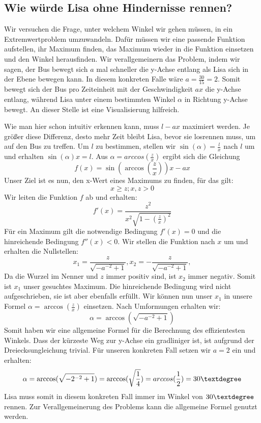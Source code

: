 \documentclass[a4paper,10pt,ngerman]{scrartcl}
\begin{document}
\subsection{Wie würde Lisa ohne Hindernisse rennen?}
Wir versuchen die Frage, unter welchem Winkel wir gehen müssen, in ein Extremwertproblem umzuwandeln. Dafür müssen wir eine passende Funktion aufstellen, ihr Maximum finden, das Maximum wieder in die Funktion einsetzen und den Winkel herausfinden. Wir verallgemeinern das Problem, indem wir sagen, der Bus bewegt sich $a$ mal schneller die y-Achse entlang als Lisa sich in der Ebene bewegen kann. In diesem konkreten Falle wäre $a=\frac{30}{15}=2$. Somit bewegt sich der Bus pro Zeiteinheit mit der Geschwindigkeit $ax$ die y-Achse entlang, während Lisa unter einem bestimmten Winkel $\alpha$ in Richtung y-Achse bewegt. An dieser Stelle ist eine Visualisierung hilfreich.
\begin{center}
\end{center}

Wie man hier schon intuitiv erkennen kann, muss $l-ax$ maximiert werden. Je größer diese Differenz, desto mehr Zeit bleibt Lisa, bevor sie losrennen muss, um auf den Bus zu treffen. Um $l$ zu bestimmen, stellen wir $\sin(\alpha)=\frac{l}{x}$ nach $l$ um und erhalten $\sin(\alpha)x=l$. Aus $\alpha = arccos(\frac{z}{x})$ ergibt sich die Gleichung 
\[
f(x) = \sin(\arccos(\frac{z}{x}))x-ax
\]
Unser Ziel ist es nun, den x-Wert eines Maximums zu finden, für das gilt: 
\[
x \geq z;  x,z > 0
\]
Wir leiten die Funktion $f$ ab und erhalten:
\[
f'(x) = \frac{z^2}{x^2 \sqrt{1-(\frac{z}{x})^2}}
\]
Für ein Maximum gilt die notwendige Bedingung $f'(x) = 0$ und die hinreichende Bedingung $f''(x) < 0$.
Wir stellen die Funktion nach $x$ um und erhalten die Nullstellen:
\[
x_1=\frac{z}{\sqrt{-a^{-2}+1}}, x_2=-\frac{z}{\sqrt{-a^{-2}+1}}, 
\]
Da die Wurzel im Nenner und $z$ immer positiv sind, ist $x_2$ immer negativ. Somit ist $x_1$ unser gesuchtes Maximum. Die hinreichende Bedingung wird nicht aufgeschrieben, sie ist aber ebenfalls erfüllt. Wir können nun unser $x_1$ in unsere Formel $\alpha = \arccos(\frac{z}{x})$ einsetzen. Nach Umformungen erhalten wir:
\[
\alpha = \arccos(\sqrt{-a^{-2}+1}) 
\]
Somit haben wir eine allgemeine Formel für die Berechnung des effizientesten Winkels. Dass der kürzeste Weg zur y-Achse ein gradliniger ist, ist aufgrund der Dreiecksungleichung trivial. Für unseren konkreten Fall setzen wir $a=2$ ein und erhalten:
\[
\alpha = \arccos(\sqrt{-2^{-2}+1}) = \arccos(\sqrt{\frac{1}{4}}) = arccos(\frac{1}{2}) = 30 \textdegree
\]
Lisa muss somit in diesem konkreten Fall immer im Winkel von $30\textdegree$ rennen. Zur Verallgemeinerung des Problems kann die allgemeine Formel genutzt werden.
\end{document}
